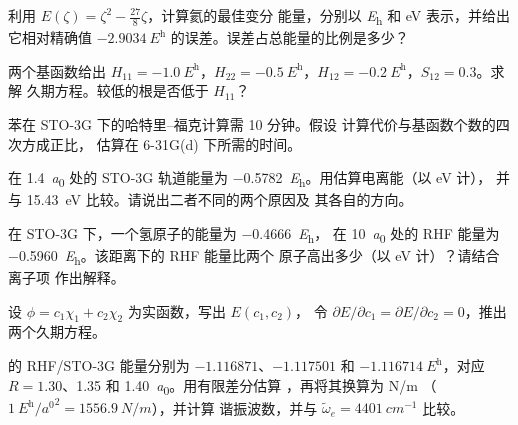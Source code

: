 \begin{exercise}[$\star\star$]\label{exo:b3:computational-chemistry:5}
利用 $E(\zeta) = \zeta^2 - \frac{27}{8}\zeta$，计算氦的最佳变分
能量，分别以 \unit{\hartree} 和 eV 表示，并给出它相对精确值
$\qty{-2.9034}{\hartree}$ 的误差。误差占总能量的比例是多少？
\end{exercise}

\begin{exercise}[$\star\star$]\label{exo:b3:computational-chemistry:6}
两个基函数给出 $H_{11} = \qty{-1.0}{\hartree}$，$H_{22} =
\qty{-0.5}{\hartree}$，$H_{12} = \qty{-0.2}{\hartree}$，$S_{12} = 0.3$。求解
久期方程。较低的根是否低于 $H_{11}$？
\end{exercise}

\begin{exercise}[$\star\star$]\label{exo:b3:computational-chemistry:7}
苯在 STO-3G 下的哈特里–福克计算需 10 分钟。假设
计算代价与基函数个数的四次方成正比，
估算在 6-31G(d) 下所需的时间。
\end{exercise}

\begin{exercise}[$\star\star$]\label{exo:b3:computational-chemistry:8}
 在 \qty{1.4}{\bohr} 处的 STO-3G 轨道能量为
\qty{-0.5782}{\hartree}。用估算电离能（以 eV 计），
并与 \qty{15.43}{eV} 比较。请说出二者不同的两个原因及
其各自的方向。
\end{exercise}

\begin{exercise}[$\star\star$]\label{exo:b3:computational-chemistry:9}
在 STO-3G 下，一个氢原子的能量为 \qty{-0.4666}{\hartree}，
 在 \qty{10}{\bohr} 处的 RHF 能量为 \qty{-0.5960}{\hartree}。该距离下的 RHF 能量比两个
原子高出多少（以 eV 计）？请结合离子项
作出解释。
\end{exercise}

\begin{exercise}[$\star\star\star$]\label{exo:b3:computational-chemistry:10}
设 $\phi = c_1\chi_1 + c_2\chi_2$ 为实函数，写出 $E(c_1,c_2)$，
令 $\partial E/\partial c_1 =
\partial E/\partial c_2 = 0$，推出两个久期方程。
\end{exercise}

\begin{exercise}[$\star\star\star$]\label{exo:b3:computational-chemistry:11}
 的 RHF/STO-3G 能量分别为 $-1.116871$、$-1.117501$ 和
$\qty{-1.116714}{\hartree}$，对应 $R = 1.30$、1.35 和 \qty{1.40}{\bohr}。用有限差分估算
，再将其换算为 \unit{N/m}
（$\qty{1}{\hartree\per\bohr\squared} = \qty{1556.9}{N/m}$），并计算
谐振波数，并与 $\tilde\omega_e = \qty{4401}{cm^{-1}}$ 比较。
\end{exercise}

